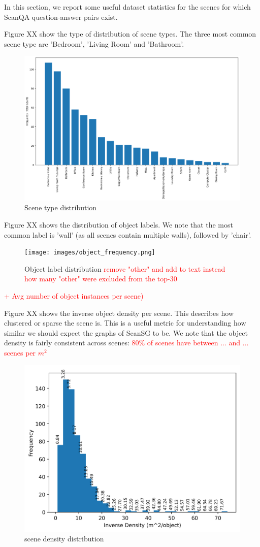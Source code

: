 In this section, we report some useful dataset statistics for the scenes for which ScanQA question-answer pairs exist.

Figure XX show the type of distribution of scene types.  The three most common scene type are 'Bedroom', 'Living Room' and 'Bathroom'.
\begin{figure}[h!]
    \centering
    \includegraphics[width=0.5\linewidth]{images/roomtype_frequency.png}
    \caption{Scene type distribution}
    \label{fig:enter-label}
\end{figure}


Figure XX shows the distribution of object labels. We note that the most common label is 'wall' (as all scenes contain multiple walls), followed by 'chair'.
\begin{figure}[h!]
    \centering
    \texttt{[image: images/object\_frequency.png]}
    \caption{Object label distribution \textcolor{red}{remove "other" and add to text instead how many "other" were excluded from the top-30}}
    \label{fig:enter-label}
\end{figure}

\textcolor{red}{+ Avg number of object instances per scene)}


Figure XX shows the inverse object density per scene. This describes how clustered or sparse the scene is. This is a useful metric for understanding how similar we should expect the graphs of ScanSG to be. We note that the object density is fairly consistent across scenes: \textcolor{red}{80$\%$ of scenes have between ... and ... scenes per $m^2$}

\begin{figure}[h!]
    \centering
    \includegraphics[width=0.5\linewidth]{images/object_density.png}
    \caption{scene density distribution}
    \label{fig:enter-label}
\end{figure}

